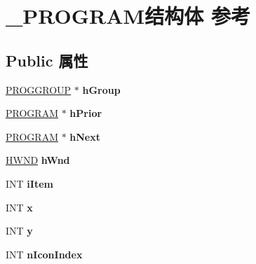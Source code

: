 \hypertarget{struct___p_r_o_g_r_a_m}{}\section{\+\_\+\+P\+R\+O\+G\+R\+A\+M结构体 参考}
\label{struct___p_r_o_g_r_a_m}
\subsection*{Public 属性}
\begin{DoxyCompactItemize}
\item 
\mbox{\label{struct___p_r_o_g_r_a_m_af33bca42ef488cbeb10c1a0f952035b5}} 
\hyperlink{struct___p_r_o_g_g_r_o_u_p}{P\+R\+O\+G\+G\+R\+O\+UP} $\ast$ {\bfseries h\+Group}
\item 
\mbox{\label{struct___p_r_o_g_r_a_m_a47c7080b671af6b65306f0632bdd997b}} 
\hyperlink{struct___p_r_o_g_r_a_m}{P\+R\+O\+G\+R\+AM} $\ast$ {\bfseries h\+Prior}
\item 
\mbox{\label{struct___p_r_o_g_r_a_m_a4b6276decbd5f389b7994ca4eff2a1aa}} 
\hyperlink{struct___p_r_o_g_r_a_m}{P\+R\+O\+G\+R\+AM} $\ast$ {\bfseries h\+Next}
\item 
\mbox{\label{struct___p_r_o_g_r_a_m_a831c9c90d64b54cc125ad6860a21acfa}} 
\hyperlink{interfacevoid}{H\+W\+ND} {\bfseries h\+Wnd}
\item 
\mbox{\label{struct___p_r_o_g_r_a_m_af956942f1867ed0a8686caeb53d06988}} 
I\+NT {\bfseries i\+Item}
\item 
\mbox{\label{struct___p_r_o_g_r_a_m_ae7d69a9af55c779e320f05e8b8b0d8cc}} 
I\+NT {\bfseries x}
\item 
\mbox{\label{struct___p_r_o_g_r_a_m_ab536f6c54416bee68477499122f14689}} 
I\+NT {\bfseries y}
\item 
\mbox{\label{struct___p_r_o_g_r_a_m_abe8d936acb6d6f7694c29ef1e17d7f8c}} 
I\+NT {\bfseries n\+Icon\+Index}
\item 
\mbox{\label{struct___p_r_o_g_r_a_m_a6ccc37437184e74c0238c65e38b5716c}} 

\end{DoxyCompactItemize}
